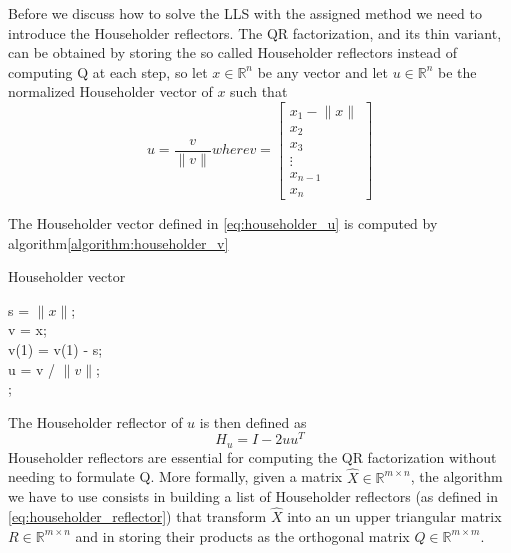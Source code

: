 Before we discuss how to solve the LLS with the assigned method we need to introduce the Householder reflectors. The QR factorization, and its thin variant, can be obtained by storing the so called Householder reflectors instead of computing Q at each step, so let $x\in \mathbb{R}^n$ be any vector and let $u\in \mathbb{R}^n$ be the normalized Householder vector of $x$ such that
\begin{subequations}
    \begin{equation}
        \label{eq:householder_u}
        u=\frac{v}{\lVert v\rVert}
    \end{equation}
    where
    \begin{equation}
        \label{eq:householder_v}
        v=\begin{bmatrix}
        x_1 - \lVert x \rVert \\
        x_2 \\
        x_3 \\
        \vdots \\
        x_{n-1} \\
        x_n
        \end{bmatrix}
    \end{equation}
\label{eq:householder_vector}
\end{subequations}
\vspace{3mm}

\noindent The Householder vector defined in \eqref{eq:householder_u} is computed by algorithm\eqref{algorithm:householder_v}

\begin{algorithm}[H]
    \caption{Householder vector}
    \label{algorithm:householder_v}
    s = $\lVert x \rVert$; \\
    v = x; \\
    v(1) = v(1) - s; \\
    u = v / $\lVert v \rVert$; \\
    ;
\end{algorithm}

\noindent The Householder reflector of $u$ is then defined as
\begin{equation}
    H_u=I-2uu^T
    \label{eq:householder_reflector}
\end{equation}
Householder reflectors are essential for computing the QR factorization without needing to formulate Q. More formally, given a matrix $\hat{X} \in \mathbb{R}^{m \times n}$, the algorithm we have to use consists in building a list of Householder reflectors (as defined in \eqref{eq:householder_reflector}) that transform $\hat{X}$ into an un upper triangular matrix $R \in \mathbb{R}^{m \times n}$ and in storing their products as the orthogonal matrix $Q \in \mathbb{R}^{m \times m}$.

